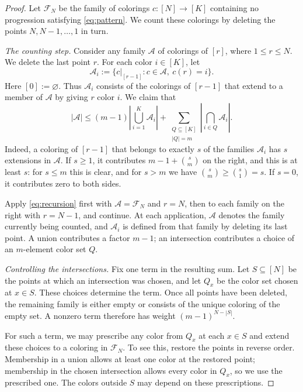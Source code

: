\documentclass[10pt,a4paper]{amsart}
\numberwithin{equation}{section}
\newcommand{\calF}{\mathcal F}
\newcommand{\calA}{\mathcal A}
\begin{document}
\begin{proof}
Let $\calF_N$ be the family of colorings $c:[N]\to[K]$ containing no progression satisfying \eqref{eq:pattern}. We count these colorings by deleting the points $N,N-1,\ldots,1$ in turn.

\emph{The counting step.}
Consider any family $\calA$ of colorings of $[r]$, where $1\leq r\leq N$. We delete the last point $r$. For each color $i\in[K]$, let
\[
 \calA_i:=\{c|_{[r-1]}:c\in\calA,\ c(r)=i\}.
\]
Here $[0]:=\varnothing$. Thus $\calA_i$ consists of the colorings of $[r-1]$ that extend to a member of $\calA$ by giving $r$ color $i$. We claim that
\begin{equation}\label{eq:recursion}
 |\calA|\leq(m-1)\left|\bigcup_{i=1}^K\calA_i\right|
 +\sum_{\substack{Q\subseteq[K]\\|Q|=m}}
 \left|\bigcap_{i\in Q}\calA_i\right|.
\end{equation}
Indeed, a coloring of $[r-1]$ that belongs to exactly $s$ of the families $\calA_i$ has $s$ extensions in $\calA$. If $s\geq1$, it contributes $m-1+\binom sm$ on the right, and this is at least $s$: for $s\leq m$ this is clear, and for $s>m$ we have $\binom sm\geq\binom s1=s$. If $s=0$, it contributes zero to both sides.

Apply \eqref{eq:recursion} first with $\calA=\calF_N$ and $r=N$, then to each family on the right with $r=N-1$, and continue. At each application, $\calA$ denotes the family currently being counted, and $\calA_i$ is defined from that family by deleting its last point. A union contributes a factor $m-1$; an intersection contributes a choice of an $m$-element color set $Q$.

\emph{Controlling the intersections.}
Fix one term in the resulting sum. Let $S\subseteq[N]$ be the points at which an intersection was chosen, and let $Q_x$ be the color set chosen at $x\in S$. These choices determine the term. Once all points have been deleted, the remaining family is either empty or consists of the unique coloring of the empty set. A nonzero term therefore has weight $(m-1)^{N-|S|}$.

For such a term, we may prescribe any color from $Q_x$ at each $x\in S$ and extend these choices to a coloring in $\calF_N$. To see this, restore the points in reverse order. Membership in a union allows at least one color at the restored point; membership in the chosen intersection allows every color in $Q_x$, so we use the prescribed one. The colors outside $S$ may depend on these prescriptions.


\end{proof}
\end{document}
